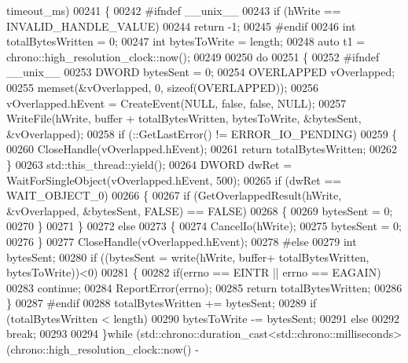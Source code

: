 \begin{DoxyCode}
      timeout_ms)
00241 \{
00242 \textcolor{preprocessor}{#ifndef \_\_unix\_\_}
00243     \textcolor{keywordflow}{if} (hWrite == INVALID\_HANDLE\_VALUE)
00244         \textcolor{keywordflow}{return} -1;
00245 \textcolor{preprocessor}{#endif}
00246     \textcolor{keywordtype}{int} totalBytesWritten = 0;
00247     \textcolor{keywordtype}{int} bytesToWrite = length;
00248     \textcolor{keyword}{auto} t1 = chrono::high\_resolution\_clock::now();
00249 
00250     \textcolor{keywordflow}{do}
00251     \{
00252 \textcolor{preprocessor}{#ifndef \_\_unix\_\_}
00253         DWORD bytesSent = 0;
00254         OVERLAPPED  vOverlapped;
00255         memset(&vOverlapped, 0, \textcolor{keyword}{sizeof}(OVERLAPPED));
00256         vOverlapped.hEvent = CreateEvent(NULL, \textcolor{keyword}{false}, \textcolor{keyword}{false}, NULL);
00257         WriteFile(hWrite, buffer + totalBytesWritten, bytesToWrite, &bytesSent, &vOverlapped);
00258         \textcolor{keywordflow}{if} (::GetLastError() != ERROR\_IO\_PENDING)
00259         \{
00260             CloseHandle(vOverlapped.hEvent);
00261             \textcolor{keywordflow}{return} totalBytesWritten;
00262         \}
00263         std::this\_thread::yield();
00264         DWORD dwRet = WaitForSingleObject(vOverlapped.hEvent, 500);
00265         \textcolor{keywordflow}{if} (dwRet == WAIT\_OBJECT\_0)
00266         \{
00267             \textcolor{keywordflow}{if} (GetOverlappedResult(hWrite, &vOverlapped, &bytesSent, FALSE) == FALSE)
00268             \{
00269                 bytesSent = 0;
00270             \}
00271         \}
00272         \textcolor{keywordflow}{else}
00273         \{
00274             CancelIo(hWrite);
00275             bytesSent = 0;
00276         \}
00277         CloseHandle(vOverlapped.hEvent);
00278 \textcolor{preprocessor}{#else}
00279         \textcolor{keywordtype}{int} bytesSent;
00280         \textcolor{keywordflow}{if} ((bytesSent  = write(hWrite, buffer+ totalBytesWritten, bytesToWrite))<0)
00281         \{
00282             \textcolor{keywordflow}{if}(errno == EINTR || errno == EAGAIN)
00283                  \textcolor{keywordflow}{continue};
00284             ReportError(errno);
00285             \textcolor{keywordflow}{return} totalBytesWritten;
00286         \}
00287 \textcolor{preprocessor}{#endif}
00288         totalBytesWritten += bytesSent;
00289         \textcolor{keywordflow}{if} (totalBytesWritten < length)
00290             bytesToWrite -= bytesSent;
00291         \textcolor{keywordflow}{else}
00292             \textcolor{keywordflow}{break};
00293 
00294     \}\textcolor{keywordflow}{while} (std::chrono::duration\_cast<std::chrono::milliseconds>(chrono::high\_resolution\_clock::now() - 

\end{DoxyCode}
